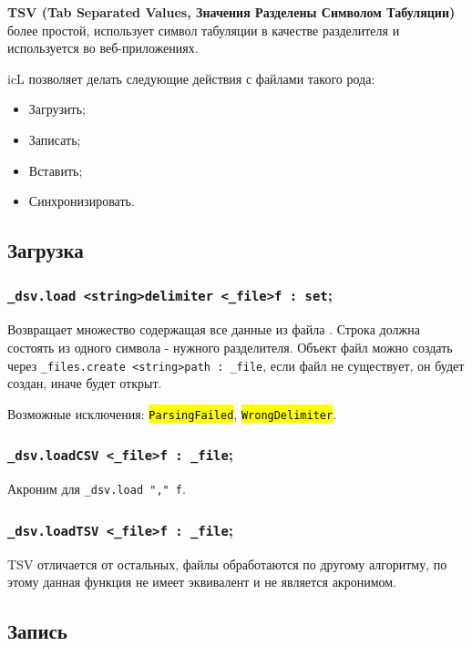 \documentclass[a4paper, 14pt]{extarticle}
\newcommand{\ferror}[1]{\foreignlanguage{english}{\fontsize{11pt}{12pt}\tt{\sethlcolor{yellow}\hl{#1}}}}
\newenvironment{icItems}
	{ \begin{itemize} [noitemsep,nolistsep] }
	{ \end{itemize} }
\begin{document}
{\bf TSV (Tab Separated Values, Значения Разделены Символом Табуляции)} более простой, использует символ табуляции в качестве разделителя и используется во веб-приложениях.

icL позволяет делать следующие действия с файлами такого рода:
\begin{icItems}
	\item Загрузить;
	\item Записать;
	\item Вставить;
	\item Синхронизировать.
\end{icItems}

\subsection{Загрузка}

\subsubsection{\lstinline|_dsv.load <string>delimiter <_file>f : set|;}

Возвращает множество содержащая все данные из файла . Строка  должна состоять из одного символа - нужного разделителя. Объект файл можно создать через \lstinline|_files.create <string>path : _file|, если файл не существует, он будет создан, иначе будет открыт.

Возможные исключения: \ferror{ParsingFailed}, \ferror{WrongDelimiter}.

\subsubsection{\lstinline|_dsv.loadCSV <_file>f : _file|;}

Акроним для \lstinline|_dsv.load "," f|.

\subsubsection{\lstinline|_dsv.loadTSV <_file>f : _file|;}

TSV отличается от остальных, файлы обработаются по другому алгоритму, по этому данная функция не имеет эквивалент и не является акронимом.

\subsection{Запись}
\end{document}
